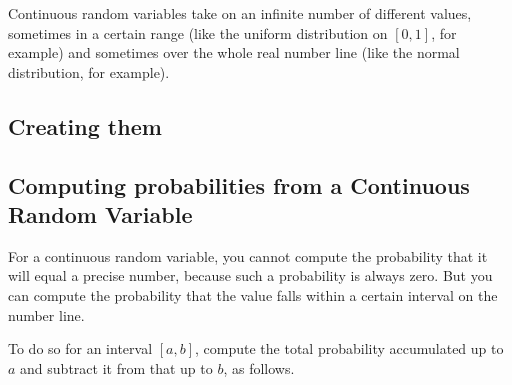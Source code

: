 \documentclass[letterpaper,10pt,english]{sphinxmanual}
\begin{document}
Continuous random variables take on an infinite number of different values, sometimes in a certain range (like the uniform distribution on \([0,1]\), for example) and sometimes over the whole real number line (like the normal distribution, for example).


\subsection{Creating them}
\label{\detokenize{GB213-review-in-Python:id1}}
\begin{sphinxVerbatim}[commandchars=\\\{\}]
     
     
      
\end{sphinxVerbatim}


\subsection{Computing probabilities from a Continuous Random Variable}
\label{\detokenize{GB213-review-in-Python:computing-probabilities-from-a-continuous-random-variable}}
For a continuous random variable, you cannot compute the probability that it will equal a precise number, because such a probability is always zero.  But you can compute the probability that the value falls within a certain interval on the number line.

To do so for an interval \([a,b]\), compute the total probability accumulated up to \(a\) and subtract it from that up to \(b\), as follows.

\begin{sphinxVerbatim}[commandchars=\\\{\}]
      
        
\end{sphinxVerbatim}
\end{document}
